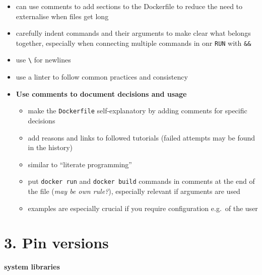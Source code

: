 \documentclass[10pt,letterpaper]{article}
\providecommand{\tightlist}{%
  \setlength{\itemsep}{0pt}\setlength{\parskip}{0pt}}
\begin{document}
\begin{itemize}
\tightlist
\item
  can use comments to add sections to the Dockerfile to reduce the need
  to externalise when files get long
\item
  carefully indent commands and their arguments to make clear what
  belongs together, especially when connecting multiple commands in onr
  \texttt{RUN} with \texttt{\&\&}
\item
  use \texttt{\textbackslash{}} for newlines
\item
  use a linter to follow common practices and consistency
\item
  \textbf{Use comments to document decisions and usage}

  \begin{itemize}
  \tightlist
  \item
    make the \texttt{Dockerfile} self-explanatory by adding comments for
    specific decisions
  \item
    add reasons and links to followed tutorials (failed attempts may be
    found in the history)
  \item
    similar to ``literate programming''
  \item
    put \texttt{docker\ run} and \texttt{docker\ build} commands in
    comments at the end of the file (\emph{may be own rule?}),
    especially relevant if arguments are used
  \item
    examples are especially crucial if you require configuration e.g.~of
    the user
  \end{itemize}
\end{itemize}

\hypertarget{pin-versions}{%
\section*{3. Pin versions}\label{pin-versions}}

\textbf{system libraries}
\end{document}
